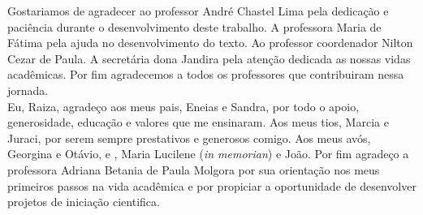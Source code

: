 \normalsize{Gostariamos de agradecer ao professor André Chastel Lima pela dedicação e paciência  durante o desenvolvimento deste trabalho. A professora Maria de Fátima pela ajuda no desenvolvimento do texto. Ao professor coordenador Nilton Cezar de Paula. A secretária dona Jandira pela atenção dedicada as nossas vidas acadêmicas. Por fim agradecemos a todos os professores que contribuiram nessa jornada.\\

\quad Eu, Raiza, agradeço aos meus pais, Eneias e Sandra, por todo o apoio, generosidade, educação e valores que me ensinaram. Aos meus tios, Marcia e Juraci, por serem sempre prestativos e generosos comigo. Aos meus avós, Georgina e Otávio, e , Maria Lucilene (\textit{in memorian}) e João. Por fim agradeço a professora Adriana Betania de Paula Molgora por sua orientação nos meus primeiros passos na vida acadêmica e por propiciar a oportunidade de desenvolver projetos de iniciação cientifica.  


}